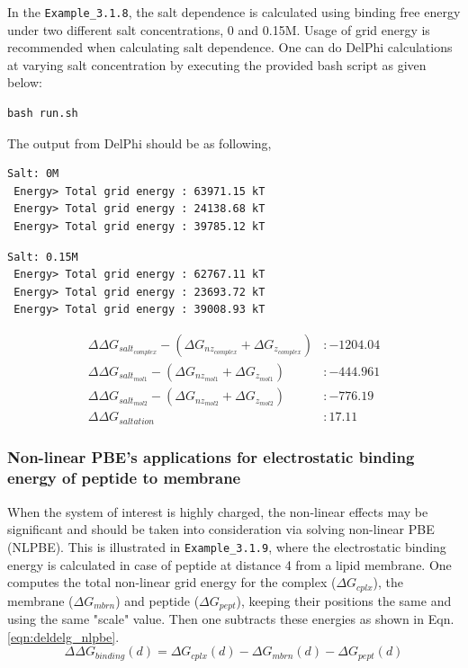 \documentclass[9pt,tutorial]{livecoms}
\newcommand*\ttvar[1]{\texttt{\expandafter\dottvar\detokenize{#1}\relax}}
\newcommand*\dottvar[1]{\ifx\relax#1\else
  \expandafter\ifx\string_#1\string_\allowbreak\else#1\fi
  \expandafter\dottvar\fi}
\begin{document}
In the \texttt{Example\_3.1.8}, the salt dependence is calculated using binding free energy under two different salt concentrations, 0 and 0.15M. Usage of grid energy is recommended when calculating salt dependence. One can do DelPhi calculations at varying salt concentration by executing the provided bash script \ttvar{run.sh} as given below:

\begin{verbatim}
bash run.sh
\end{verbatim}

The output from DelPhi should be as following,

\begin{verbatim}
Salt: 0M 
 Energy> Total grid energy : 63971.15 kT
 Energy> Total grid energy : 24138.68 kT
 Energy> Total grid energy : 39785.12 kT
\end{verbatim}

\begin{verbatim}
Salt: 0.15M
 Energy> Total grid energy : 62767.11 kT
 Energy> Total grid energy : 23693.72 kT
 Energy> Total grid energy : 39008.93 kT
\end{verbatim}

\begin{equation}
\begin{aligned}
\Delta \Delta G_{salt_{complex}} - (\Delta G_{nz_{complex}} + \Delta G_{z_{complex}}) &: -1204.04 \nonumber \\
\Delta\Delta G_{salt_{mol1}} - (\Delta G_{nz_{mol1}} + \Delta G_{z_{mol1}}) &: -444.961 \nonumber \\
\Delta\Delta G_{salt_{mol2}} - (\Delta G_{nz_{mol2}} + \Delta G_{z_{mol2}}) &: -776.19 \nonumber \\
\Delta\Delta G_{saltation} &: 17.11 \nonumber 
\end{aligned}
\end{equation}

\subsubsection{Non-linear PBE's applications for electrostatic binding energy of peptide to membrane}
When the system of interest is highly charged, the non-linear effects may be significant and should be taken into consideration via solving non-linear PBE (NLPBE). This is illustrated in \texttt{Example\_3.1.9}, where the electrostatic binding energy is calculated in case of peptide at distance 4 \text{\AA} from a lipid membrane. One computes the total non-linear grid energy for the complex ($ \Delta G_{cplx}$), the membrane ($ \Delta G_{mbrn}$) and peptide ($ \Delta G_{pept} $), keeping their positions the same and using the same "scale" value. Then one subtracts these energies as shown in Eqn. \ref{eqn:deldelg_nlpbe}.
\begin{equation}\label{eqn:deldelg_nlpbe}
\Delta\Delta G_{binding}(d) = \Delta G_{cplx}(d) - \Delta G_{mbrn}(d) - \Delta G_{pept}(d)
\end{equation}
\end{document}
